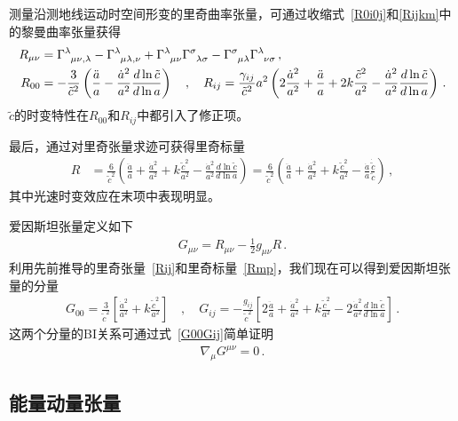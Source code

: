\documentclass[jkps,preprint,fleqn]{revtex4}
\newcommand{\tc}{\tilde{c}}
\begin{document}
测量沿测地线运动时空间形变的里奇曲率张量，可通过收缩式~\eqref{R0i0j}和\eqref{Rijkm}中的黎曼曲率张量获得
\begin{align}
R_{\mu\nu} &= \tensor{\Gamma}{^\lambda_\mu_\nu_,_\lambda} - \tensor{\Gamma}{^\lambda_\mu_\lambda_,_\nu} + \tensor{\Gamma}{^\lambda_\mu_\nu} \tensor{\Gamma}{^\sigma_\lambda_\sigma} - \tensor{\Gamma}{^\sigma_\mu_\lambda} \tensor{\Gamma}{^\lambda_\nu_\sigma} \label{Rmn} \,, \\ R_{00} &= -\frac{3}{\tc^2} \left( \frac{\ddot{a}}{a} - \frac{\dot{a}^2}{a^2} \frac{d \ln \tc}{ d \ln a}  \right) \quad , \quad R_{ij} = \frac{\gamma_{ij}}{\tc^2} a^2 \left( 2 \frac{\dot{a}^2}{a^2} + \frac{\ddot{a}}{a} + 2 k \frac{\tc^2}{a^2} - \frac{\dot{a}^2}{a^2} \frac{d \ln \tc}{ d \ln a}  \right) \label{Rij} \,. \end{align}
$\tc$的时变特性在$R_{00}$和$R_{ij}$中都引入了修正项。

最后，通过对里奇张量求迹可获得里奇标量
\begin{align} R &= \frac{6}{\tc^2} \left( \frac{\ddot{a}}{a} + \frac{\dot{a}^2}{a^2} + k \frac{\tc^2}{a^2} - \frac{\dot{a}^2}{a^2} \frac{d \ln \tc}{ d \ln a}  \right) =  \frac{6}{\tc^2} \left( \frac{\ddot{a}}{a} + \frac{\dot{a}^2}{a^2} + k \frac{\tc^2}{a^2} - \frac{\dot{a}}{a} \frac{\dot{\tc}}{\tc}  \right)  \label{Rmp} \,, \end{align}
其中光速时变效应在末项中表现明显。

爱因斯坦张量定义如下
\begin{align}
G_{\mu\nu} = R_{\mu\nu} - \frac{1}{2} g_{\mu\nu} R \label{Gmunu} \,.
\end{align}
利用先前推导的里奇张量~\eqref{Rij}和里奇标量~\eqref{Rmp}，我们现在可以得到爱因斯坦张量的分量
\begin{align}
G_{00} = \frac{3}{\tc^2} \left[ \frac{\dot{a}^2}{a^2} + k \frac{\tc^2}{a^2} \right] \quad , \quad G_{ij} = -\frac{g_{ij}}{\tc^2} \left[ 2 \frac{\ddot{a}}{a} + \frac{\dot{a}^2}{a^2} + k \frac{\tc^2}{a^2} - 2 \frac{\dot{a}^2}{a^2} \frac{d \ln \tc}{d \ln a} \right] \,. \label{G00Gij}
\end{align}
这两个分量的BI关系可通过式~\eqref{G00Gij}简单证明
\begin{align}
\nabla_{\mu} G^{\mu \nu} = 0 \label{nablaGmunu} \,.
\end{align}
\subsection{能量动量张量}\label{subsec:Tmunu}
\end{document}
